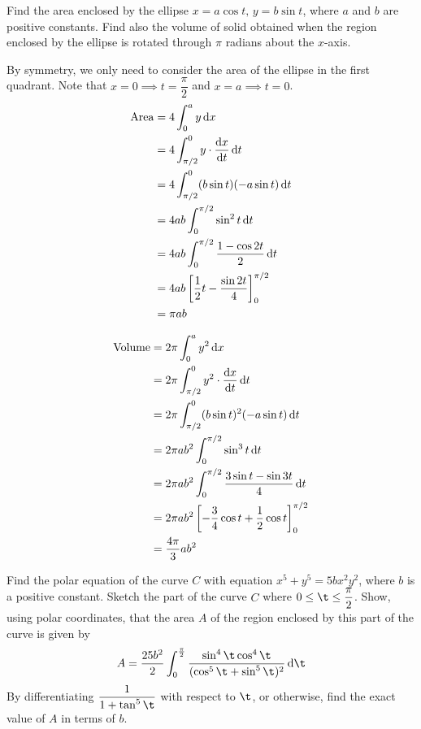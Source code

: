 \documentclass{echw}
\begin{document}

    \problem{}
        Find the area enclosed by the ellipse $x = a \cos t, \, y = b \sin t$, where $a$ and $b$ are positive constants. Find also the volume of solid obtained when the region enclosed by the ellipse is rotated through $\pi$ radians about the $x$-axis.

    \solution
        By symmetry, we only need to consider the area of the ellipse in the first quadrant. Note that $x = 0 \implies t = \dfrac\pi2$ and $x = a \implies t = 0$.
        \begin{align*}
            \operatorname{Area} &= 4\int_0^a y \mathop{\mathrm{d}x}\\
            &= 4\int_{\pi/2}^0 y \cdot \dfrac{\mathrm{d} x}{\mathrm{d} t} \mathop{\mathrm{d}t}\\
            &= 4\int_{\pi/2}^0 (b\sin t)(-a\sin t) \mathop{\mathrm{d}t}\\
            &= 4ab\int_0^{\pi/2} \sin^2 t \mathop{\mathrm{d}t}\\
            &= 4ab\int_0^{\pi/2} \dfrac{1 - \cos 2t}2 \mathop{\mathrm{d}t}\\
            &= 4ab\left[\dfrac{1}2 t - \dfrac{\sin 2t}4\right]_{0}^{\pi/2}\\
            &= \pi ab
        \end{align*}


        \begin{align*}
            \operatorname{Volume} &= 2\pi \int_0^a y^2 \mathop{\mathrm{d}x}\\
            &= 2\pi\int_{\pi/2}^0 y^2 \cdot \dfrac{\mathrm{d} x}{\mathrm{d} t} \mathop{\mathrm{d}t}\\
            &= 2\pi\int_{\pi/2}^0 (b\sin t)^2 (-a\sin t) \mathop{\mathrm{d}t}\\
            &= 2\pi a b^2 \int_0^{\pi/2} \sin^3 t \mathop{\mathrm{d}t}\\
            &= 2\pi a b^2 \int_0^{\pi/2} \dfrac{3\sin t - \sin 3t}{4} \mathop{\mathrm{d}t}\\
            &= 2\pi a b^2 \left[-\dfrac34 \cos t + \dfrac12 \cos t\right]_{0}^{\pi/2}\\
            &= \dfrac{4\pi}3 ab^2
        \end{align*}


    \problem{}
        Find the polar equation of the curve $C$ with equation $x^5 + y^5 = 5bx^2y^2$, where $b$ is a positive constant. Sketch the part of the curve $C$ where $0 \leq \t \leq \dfrac\pi2$. Show, using polar coordinates, that the area $A$ of the region enclosed by this part of the curve is given by
        \begin{equation*}
            A = \dfrac{25b^2}2 \int_0^{\frac\pi2} \dfrac{\sin^4\t\cos^4\t}{(\cos^5\t + \sin^5\t)^2} \d \t
        \end{equation*}
        By differentiating $\dfrac1{1 + \tan^5\t}$ with respect to $\t$, or otherwise, find the exact value of $A$ in terms of $b$.
\end{document}

